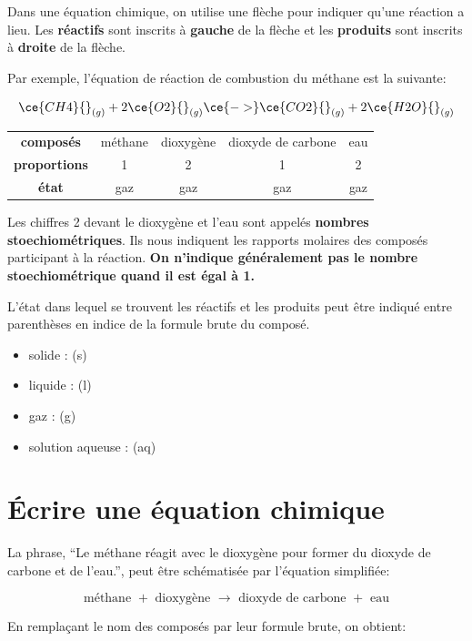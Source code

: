 \documentclass[
  11pt,
  a4paper,
  openany]{book}
\providecommand{\tightlist}{%
  \setlength{\itemsep}{0pt}\setlength{\parskip}{0pt}}
\begin{document}
Dans une équation chimique, on utilise une flèche pour indiquer qu'une réaction a lieu. Les \textbf{réactifs} sont inscrits à \textbf{gauche} de la flèche et les \textbf{produits} sont inscrits à \textbf{droite} de la flèche.

Par exemple, l'équation de réaction de combustion du méthane est la suivante:

\[ \ce{CH4} {}_{(g)} + 2 \ce{O2} {}_{(g)} \ce{->} \ce{CO2} {}_{(g)} + 2 \ce{H2O} {}_{(g)} \]

\begin{longtable}[]{@{}ccccc@{}}
\toprule()
\endhead
\textbf{composés} & méthane & dioxygène & dioxyde de carbone & eau \\
\textbf{proportions} & 1 & 2 & 1 & 2 \\
\textbf{état} & gaz & gaz & gaz & gaz \\
\bottomrule()
\end{longtable}

Les chiffres 2 devant le dioxygène et l'eau sont appelés \textbf{nombres stoechiométriques}. Ils nous indiquent les rapports molaires des composés participant à la réaction. \textbf{On n'indique généralement pas le nombre stoechiométrique quand il est égal à 1.}

L'état dans lequel se trouvent les réactifs et les produits peut être indiqué entre parenthèses en indice de la formule brute du composé.

\begin{itemize}
\tightlist
\item
  solide : (s)
\item
  liquide : (l)
\item
  gaz : (g)
\item
  solution aqueuse : (aq)
\end{itemize}

\hypertarget{uxe9crire-une-uxe9quation-chimique}{%
\section{Écrire une équation chimique}\label{uxe9crire-une-uxe9quation-chimique}}

La phrase, ``Le méthane réagit avec le dioxygène pour former du dioxyde de carbone et de l'eau.'', peut être schématisée par l'équation simplifiée:

\[ \text{méthane } + \text{ dioxygène } \longrightarrow \text{ dioxyde de carbone } + \text{ eau} \]

En remplaçant le nom des composés par leur formule brute, on obtient:
\end{document}
